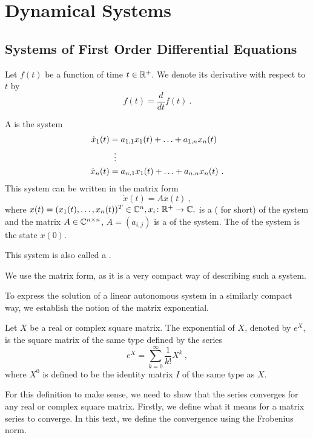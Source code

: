 \chapter{Dynamical Systems}
\label{chap:intr}

\section{Systems of First Order Differential Equations}

\begin{remark}
	Let $f(t)$ be a function of time $t\in\mathbb{R}^+$. We denote its derivative with respect to $t$ by $$\dot{f}(t)=\frac{d}{dt}f(t)\ .$$
\end{remark}

\begin{definition}
	A  is the system 
	\begin{align*}
		\dot{x}_1(t)&=a_{1,1}x_1(t)+\ldots+a_{1,n}x_n(t) \\
		&\vdotswithin{=} \\
		\dot{x}_n(t)&=a_{n,1}x_1(t)+\ldots+a_{n,n}x_n(t)\ .
	\end{align*}
	This system can be written in the matrix form $$\dot{x}(t)=Ax(t)\ ,$$ where $x(t)=(x_1(t),\ldots,x_n(t))^T \in \mathbb{C}^n, x_i\colon\mathbb{R}^+\to\mathbb{C},$ is a  ( for short) of the system and the matrix $A\in \mathbb{C}^{n\times n}$, $A=(a_{i,j})$ is a  of the system. The  of the system is the state $x(0)$.

	This system is also called a .
\end{definition}

We use the matrix form, as it is a very compact way of describing such a system.

To express the solution of a linear autonomous system in a similarly compact way, we establish the notion of the matrix exponential.

\begin{definition}
	Let $X$ be a real or complex square matrix. The exponential of $X$, denoted by $e^X$, is the square matrix of the same type defined by the series $$e^{X}=\sum _{k=0}^{\infty}\frac{1}{k!}X^{k}\ ,$$
	where $X^0$ is defined to be the identity matrix $I$ of the same type as $X$.
\end{definition}

For this definition to make sense, we need to show that the series converges for any real or complex square matrix. Firstly, we define what it means for a matrix series to converge. In this text, we define the convergence using the Frobenius norm.

